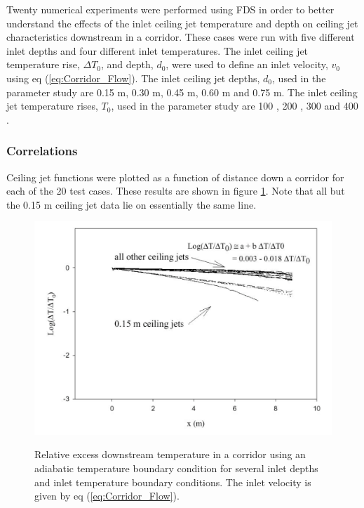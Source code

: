 Twenty numerical experiments were performed using FDS in order to better understand the effects of the inlet ceiling jet temperature and depth on ceiling jet characteristics downstream in a corridor.  These cases were run with five different inlet depths and four different inlet temperatures.  The inlet ceiling jet temperature rise, $\Delta T_0$, and depth, $d_0$, were used to define an inlet velocity, $v_0$ using eq (\ref{eq:Corridor_Flow}).  The inlet ceiling jet depths, $d_0$, used in the parameter study are 0.15 m, 0.30 m, 0.45 m, 0.60 m and 0.75 m. The inlet ceiling jet temperature rises, $T_0$, used in the parameter study are 100 \degc, 200 \degc, 300 \degc and 400 \degc.

\subsubsection{Correlations}

Ceiling jet functions were plotted as a function of distance down a corridor for each of the 20 test cases.  These results are shown in figure \ref{fig:Corr_Flow}.  Note that all but the 0.15 m ceiling jet data lie on essentially the same line.

\begin{figure}
\begin{center}
\includegraphics[width=5.0in]{FIGURES/Theory/Corr_Flow}\\
\end{center}
\caption{Relative excess downstream temperature in a corridor using an adiabatic temperature boundary condition for several inlet depths and inlet temperature boundary conditions. The inlet velocity is given by eq (\ref{eq:Corridor_Flow}).}
 \label{fig:Corr_Flow}
\end{figure}

